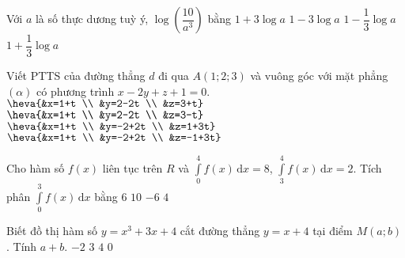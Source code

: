 \begin{ex}%
	Với $a$ là số thực dương tuỳ ý, $\log \left(\dfrac{10}{a^3}\right)$ bằng
	\choice
	{$1+3\log a$}
	{\True $1-3\log a$}
	{$1-\dfrac{1}{3}\log a$}
	{$1+\dfrac{1}{3}\log a$}
\end{ex}


\begin{ex}%
	Viết PTTS của đường thẳng $d$ đi qua $A(1;2;3)$ và vuông góc với mặt phẳng $(\alpha)$ có phương trình $x-2y+z+1=0$.
	\choice
	{\True $\heva{&x=1+t \\ &y=2-2t \\ &z=3+t}$}
	{$\heva{&x=1+t \\ &y=2-2t \\ &z=3-t}$}
	{$\heva{&x=1+t \\ &y=-2+2t \\ &z=1+3t}$}
	{$\heva{&x=1+t \\ &y=-2+2t \\ &z=-1+3t}$}
\end{ex}


\begin{ex}%
	Cho hàm số $f(x)$ liên tục trên $R$ và $\displaystyle\int\limits_0^4f(x) \mathrm{\,d}x=8$, $\displaystyle\int\limits_3^4f(x) \mathrm{\,d}x=2$. Tích phân $\displaystyle\int\limits_0^3f(x) \mathrm{\,d}x$ bằng
	\choice
	{\True $6$}
	{$10$}
	{$-6$}
	{$4$}
\end{ex}


\begin{ex}%
	Biết đồ thị hàm số $y=x^3+3x+4$ cắt đường thẳng $y=x+4$ tại điểm $M(a;b)$. Tính $a+b$.
	\choice
	{$-2$}
	{$3$}
	{\True $4$}
	{$0$}
\end{ex}


